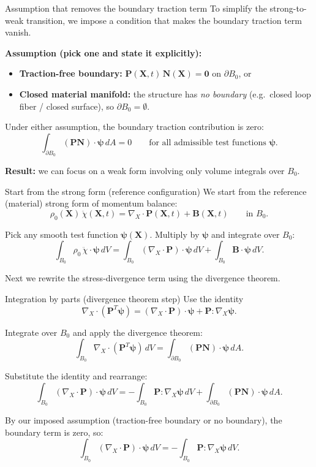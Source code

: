\documentclass[aspectratio=169]{beamer}
\newcommand{\X}{\bm{X}}
\newcommand{\gradX}{\nabla_{\!X}}
\newcommand{\divX}{\nabla_{\!X}\!\cdot}
\newcommand{\Pten}{\bm{P}}        %
\newcommand{\Nvec}{\bm{N}}       %
\begin{document}
\begin{frame}{Assumption that removes the boundary traction term}
\small
To simplify the strong-to-weak transition, we impose a condition that makes the boundary traction term vanish.

\medskip
\textbf{Assumption (pick one and state it explicitly):}
\begin{itemize}
\item \textbf{Traction-free boundary:} \(\Pten(\X,t)\,\Nvec(\X)=\bm{0}\) on \(\partial B_0\), \quad or
\item \textbf{Closed material manifold:} the structure has \emph{no boundary} (e.g.\ closed loop fiber / closed surface), so \(\partial B_0=\emptyset\).
\end{itemize}

\medskip
Under either assumption, the boundary traction contribution is zero:
\[
\int_{\partial B_0}(\Pten \Nvec)\cdot \bm{\psi}\,dA = 0
\qquad \text{for all admissible test functions } \bm{\psi}.
\]

\medskip
\textbf{Result:} we can focus on a weak form involving only volume integrals over \(B_0\).
\end{frame}


\begin{frame}{Start from the strong form (reference configuration)}
\small
We start from the reference (material) strong form of momentum balance:
\[
\rho_0(\X)\,\ddot{\chi}(\X,t)=\divX \Pten(\X,t)+\bm{B}(\X,t)
\qquad \text{in } B_0.
\]

\medskip
Pick any smooth test function \(\bm{\psi}(\X)\).
Multiply by \(\bm{\psi}\) and integrate over \(B_0\):
\[
\int_{B_0}\rho_0\,\ddot{\chi}\cdot\bm{\psi}\,dV
=
\int_{B_0}(\divX\Pten)\cdot\bm{\psi}\,dV
+
\int_{B_0}\bm{B}\cdot\bm{\psi}\,dV.
\]

\medskip
Next we rewrite the stress-divergence term using the divergence theorem.
\end{frame}


\begin{frame}{Integration by parts (divergence theorem step)}
\small
Use the identity
\[
\divX(\Pten^{T}\bm{\psi})=(\divX\Pten)\cdot\bm{\psi}+\Pten:\gradX\bm{\psi}.
\]

\medskip
Integrate over \(B_0\) and apply the divergence theorem:
\[
\int_{B_0}\divX(\Pten^{T}\bm{\psi})\,dV
=
\int_{\partial B_0}(\Pten\Nvec)\cdot\bm{\psi}\,dA.
\]

\medskip
Substitute the identity and rearrange:
\[
\int_{B_0}(\divX\Pten)\cdot\bm{\psi}\,dV
=
-\int_{B_0}\Pten:\gradX\bm{\psi}\,dV
+\int_{\partial B_0}(\Pten\Nvec)\cdot\bm{\psi}\,dA.
\]

\medskip
By our imposed assumption (traction-free boundary or no boundary),
the boundary term is zero, so:
\[
\int_{B_0}(\divX\Pten)\cdot\bm{\psi}\,dV
=
-\int_{B_0}\Pten:\gradX\bm{\psi}\,dV.
\]
\end{frame}
\end{document}
